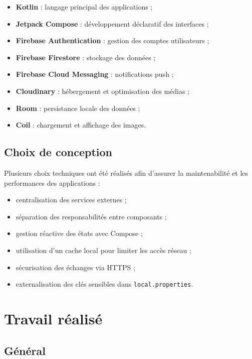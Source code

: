 \documentclass[a4paper, 12pt]{article}
\begin{document}
\begin{justify}
\begin{itemize}
    \item \textbf{Kotlin} : langage principal des applications ;
    \item \textbf{Jetpack Compose} : développement déclaratif des interfaces ;
    \item \textbf{Firebase Authentication} : gestion des comptes utilisateurs ;
    \item \textbf{Firebase Firestore} : stockage des données ;
    \item \textbf{Firebase Cloud Messaging} : notifications push ;
    \item \textbf{Cloudinary} : hébergement et optimisation des médias ;
    \item \textbf{Room} : persistance locale des données ;
    \item \textbf{Coil} : chargement et affichage des images.
\end{itemize}

\subsection*{Choix de conception}

Plusieurs choix techniques ont été réalisés afin d'assurer la maintenabilité et les performances des applications :
\begin{itemize}
    \item centralisation des services externes ;
    \item séparation des responsabilités entre composants ;
    \item gestion réactive des états avec Compose ;
    \item utilisation d'un cache local pour limiter les accès réseau ;
    \item sécurisation des échanges via HTTPS ;
    \item externalisation des clés sensibles dans \texttt{local.properties}.
\end{itemize}

\section*{Travail réalisé}



\subsection*{Général}


\end{justify}
\end{document}
